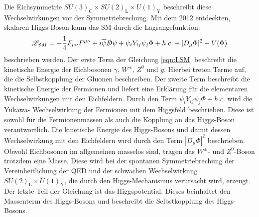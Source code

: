 Die Eichsymmetrie $SU(3)_\text{C} \times SU(2)_\text{L} \times U(1)_\text{Y}$ beschreibt diese Wechselwirkungen vor der Symmetriebrechung. Mit dem 2012 entdeckten, skalaren Higgs-Boson  kann das SM durch die Lagrangefunktion:
\begin{equation}
  \mathscr{L}_{SM} = - \frac{1}{4}F_{\mu\nu}F^{\mu\nu} + i \overline{\psi}\slashed{D}\psi + \psi_i Y_{ij} \psi_j \Phi + h.c. + |D_{\mu}\Phi|^2 - V(\Phi)
  \label{eqn:LSM}
\end{equation}
beschrieben werden. Der erste Term der Gleichung \eqref{eqn:LSM} beschreibt die kinetische Energie der Eichbosonen $\gamma$, $W^{\pm}$, $Z^0$ und $g$.
Hierbei treten Terme auf, die die Selbstkopplung der Gluonen beschreiben. Der zweite Term beschreibt die kinetische Energie der Fermionen und liefert eine Erklärung für die elementaren Wechselwirkungen mit den Eichfeldern.
Durch den Term $\psi_i Y_{ij} \psi_j \Phi + h.c.$ wird die Yukawa- Wechselwirkung der Fermionen mit dem Higgsfeld beschrieben.
Diese ist sowohl für die Fermionenmassen als auch die Kopplung an das Higgs-Boson verantwortlich.
Die kinetische Energie des Higgs-Bosons und damit dessen
Wechselwirkung mit den Eichfeldern wird durch den Term $|D_{\mu}\Phi|^2$ beschrieben. Obwohl Eichbosonen im allgemeinen masselos sind, tragen das $W^{\pm}$- und $Z^0$-Boson trotzdem eine Masse. Diese wird bei der spontanen Symmetriebrechung der Vereinheitlichung der QED und der schwachen Wechselwirkung $SU(2)_\text{L} \times U(1)_\text{Y}$, die durch den Higgs-Mechanismus verursacht wird, erzeugt. Der letzte Teil der Gleichung ist das Higgspotential. Dieses beinhaltet den Massenterm des Higgs-Bosons und beschreibt die Selbstkopplung des Higgs-Bosons.

